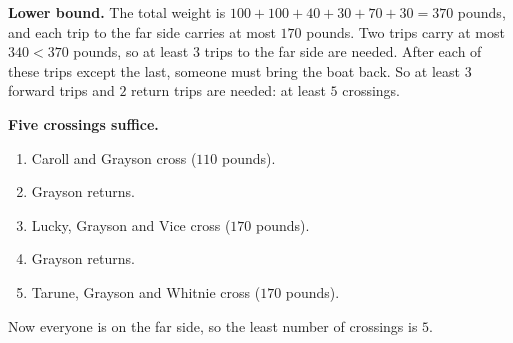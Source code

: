 \textbf{Lower bound.} The total weight is $100+100+40+30+70+30=370$ pounds, and each trip to the far side carries at most $170$ pounds. Two trips carry at most $340<370$ pounds, so at least $3$ trips to the far side are needed. After each of these trips except the last, someone must bring the boat back. So at least $3$ forward trips and $2$ return trips are needed: at least $5$ crossings.

\textbf{Five crossings suffice.}
\begin{enumerate}
\item Caroll and Grayson cross ($110$ pounds).
\item Grayson returns.
\item Lucky, Grayson and Vice cross ($170$ pounds).
\item Grayson returns.
\item Tarune, Grayson and Whitnie cross ($170$ pounds).
\end{enumerate}
Now everyone is on the far side, so the least number of crossings is $\boxed{5}$.
